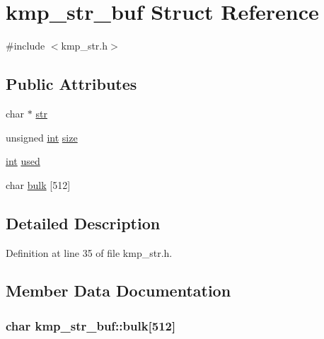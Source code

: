 \hypertarget{structkmp__str__buf}{\section{kmp\-\_\-str\-\_\-buf Struct Reference}
\label{structkmp__str__buf}
}


{\ttfamily \#include $<$kmp\-\_\-str.\-h$>$}

\subsection*{Public Attributes}
\begin{DoxyCompactItemize}
\item 
char $\ast$ \hyperlink{structkmp__str__buf_ac87d13b209cb66e1747bf327dddad2bf}{str}
\item 
unsigned \hyperlink{ittnotify__static_8h_a8b8dcd723308a8cb5d84277c7a3fff70}{int} \hyperlink{structkmp__str__buf_ac6d2fa14f64844ce2113b7d3d3b8d82a}{size}
\item 
\hyperlink{ittnotify__static_8h_a8b8dcd723308a8cb5d84277c7a3fff70}{int} \hyperlink{structkmp__str__buf_aac402122dd4496ecde0715de265d96b0}{used}
\item 
char \hyperlink{structkmp__str__buf_aa9c6640efa6111c3af8199a64fb58e27}{bulk} \mbox{[}512\mbox{]}
\end{DoxyCompactItemize}


\subsection{Detailed Description}


Definition at line 35 of file kmp\-\_\-str.\-h.



\subsection{Member Data Documentation}
\hypertarget{structkmp__str__buf_aa9c6640efa6111c3af8199a64fb58e27}{
\subsubsection[{bulk}]{\setlength{\rightskip}{0pt plus 5cm}char kmp\-\_\-str\-\_\-buf\-::bulk\mbox{[}512\mbox{]}}}\label{structkmp__str__buf_aa9c6640efa6111c3af8199a64fb58e27}


